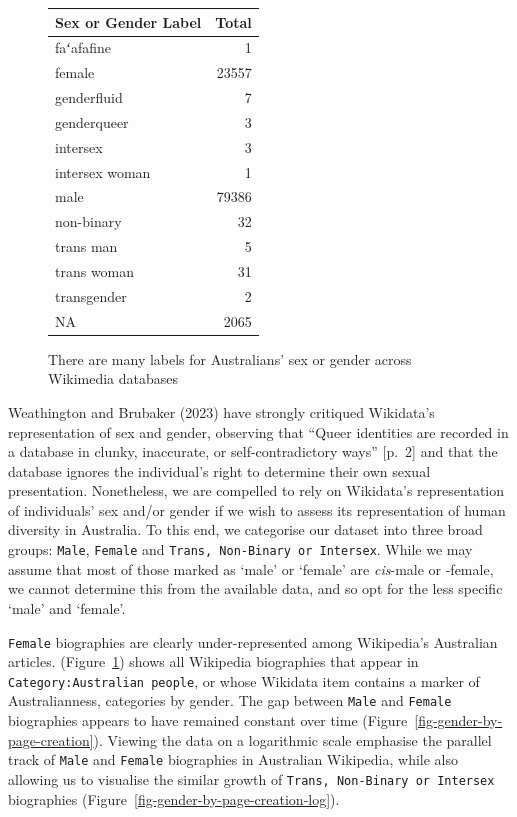 \documentclass[
  a4paper,
  DIV=11,
  numbers=noendperiod]{scrreprt}
\begin{document}
\begin{figure}

{\centering 

\begin{longtable}[]{@{}lr@{}}
\toprule\noalign{}
Sex or Gender Label & Total \\
\midrule\noalign{}
\endhead
\bottomrule\noalign{}
\endlastfoot
faʻafafine & 1 \\
female & 23557 \\
genderfluid & 7 \\
genderqueer & 3 \\
intersex & 3 \\
intersex woman & 1 \\
male & 79386 \\
non-binary & 32 \\
trans man & 5 \\
trans woman & 31 \\
transgender & 2 \\
NA & 2065 \\
\end{longtable}

}

\caption{\label{fig-genders-in-dataset}There are many labels for
Australians' sex or gender across Wikimedia databases}

\end{figure}

Weathington and Brubaker (2023) have strongly critiqued Wikidata's
representation of sex and gender, observing that ``Queer identities are
recorded in a database in clunky, inaccurate, or self-contradictory
ways'' {[}p.~2{]} and that the database ignores the individual's right
to determine their own sexual presentation. Nonetheless, we are
compelled to rely on Wikidata's representation of individuals' sex
and/or gender if we wish to assess its representation of human diversity
in Australia. To this end, we categorise our dataset into three broad
groups: \texttt{Male}, \texttt{Female} and
\texttt{Trans,\ Non-Binary\ or\ Intersex}. While we may assume that most
of those marked as `male' or `female' are \emph{cis}-male or -female, we
cannot determine this from the available data, and so opt for the less
specific `male' and `female'.

\texttt{Female} biographies are clearly under-represented among
Wikipedia's Australian articles. (Figure~\ref{fig-genders-in-dataset})
shows all Wikipedia biographies that appear in
\texttt{Category:Australian\ people}, or whose Wikidata item contains a
marker of Australianness, categories by gender. The gap between
\texttt{Male} and \texttt{Female} biographies appears to have remained
constant over time (Figure~\ref{fig-gender-by-page-creation}). Viewing
the data on a logarithmic scale emphasise the parallel track of
\texttt{Male} and \texttt{Female} biographies in Australian Wikipedia,
while also allowing us to visualise the similar growth of
\texttt{Trans,\ Non-Binary\ or\ Intersex} biographies
(Figure~\ref{fig-gender-by-page-creation-log}).
\end{document}
